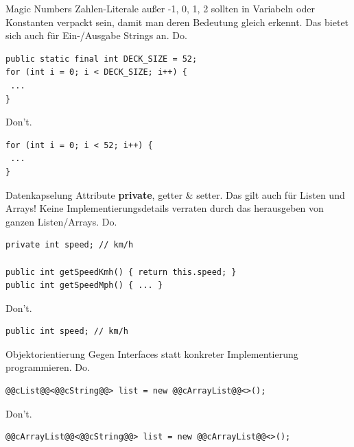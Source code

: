 \documentclass[aspectratio=169]{beamer}
\begin{document}
\begin{frame}[fragile]
  \begin{block}{Magic Numbers}
    Zahlen-Literale außer -1, 0, 1, 2 sollten in Variabeln oder Konstanten verpackt sein, damit man deren Bedeutung gleich erkennt.
    Das bietet sich auch für Ein-/Ausgabe Strings an. \linebreak
    \pause
    \color{nicegreen}Do.\color{FGround}
    \begin{lstlisting}[numbers=none]
public static final int DECK_SIZE = 52; 
for (int i = 0; i < DECK_SIZE; i++) { 
 ...
}
    \end{lstlisting}
    \pause
    \color{alertcolor}Don't.\color{FGround}
    \begin{lstlisting}[numbers=none]
for (int i = 0; i < 52; i++) { 
 ...
} 
    \end{lstlisting}
  \end{block}
\end{frame}

\begin{frame}[fragile]
  \begin{block}{Datenkapselung}
    Attribute \textbf{private}, getter \& setter. Das gilt auch für Listen und Arrays! 
    Keine Implementierungsdetails verraten durch das herausgeben von ganzen Listen/Arrays. \linebreak
    \pause
    \color{nicegreen}Do.\color{FGround}
    \begin{lstlisting}[numbers=none]
private int speed; // km/h

public int getSpeedKmh() { return this.speed; }
public int getSpeedMph() { ... }
    \end{lstlisting}
    \pause
    \color{alertcolor}Don't.\color{FGround}
    \begin{lstlisting}[numbers=none]
public int speed; // km/h
    \end{lstlisting}
  \end{block}
\end{frame}

\begin{frame}[fragile]
  \begin{block}{Objektorientierung}
    Gegen Interfaces statt konkreter Implementierung programmieren. \linebreak
    \pause
    \color{nicegreen}Do.\color{FGround}
    \begin{lstlisting}[numbers=none]
@@cList@@<@@cString@@> list = new @@cArrayList@@<>();
    \end{lstlisting}
    \pause
    \color{alertcolor}Don't.\color{FGround}
    \begin{lstlisting}[numbers=none]
@@cArrayList@@<@@cString@@> list = new @@cArrayList@@<>();
    \end{lstlisting}
  \end{block}
\end{frame}
\end{document}
